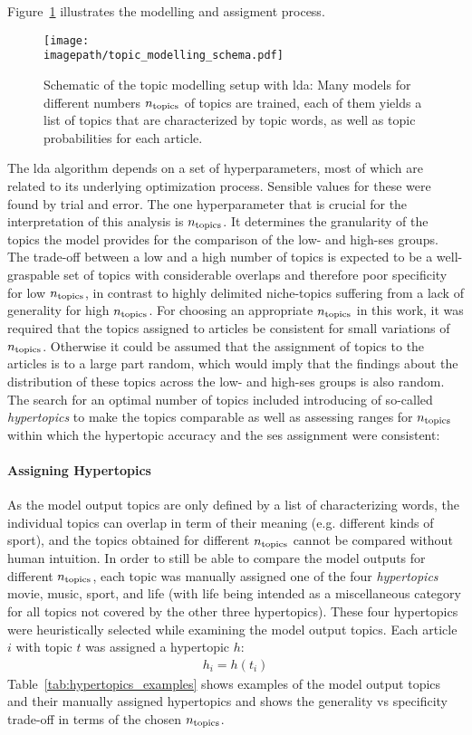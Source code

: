 Figure~\ref{fig:topic_modelling_schema} illustrates the modelling and assigment process.
\begin{figure}
    \centering
    \texttt{[image: \\imagepath/topic\_modelling\_schema.pdf]}
    \caption{Schematic of the topic modelling setup with \gls{lda}: Many models for different numbers $n_\text{topics}$ of topics are trained, each of them yields a list of topics that are characterized by topic words, as well as topic probabilities for each article.}\label{fig:topic_modelling_schema}
\end{figure}

The \gls{lda} algorithm depends on a set of hyperparameters, most of which are related to its underlying optimization process.  Sensible values for these were found by trial and error. The one hyperparameter that is crucial for the interpretation of this analysis is $n_\text{topics}$. It determines the granularity of the topics the model provides for the comparison of the low- and high-\gls{ses} groups. The trade-off between a low and a high number of topics is expected to be a well-graspable set of topics with considerable overlaps and therefore poor specificity for low $n_\text{topics}$, in contrast to highly delimited niche-topics suffering from a lack of generality for high $n_\text{topics}$. For choosing an appropriate $n_\text{topics}$ in this work, it was required that the topics assigned to articles be consistent for small variations of $n_\text{topics}$. Otherwise it could be assumed that the assignment of topics to the articles is to a large part random, which would imply that the findings about the distribution of these topics across the low- and high-\gls{ses} groups is also random. The search for an optimal number of topics included introducing of so-called \textit{hypertopics} to make the topics comparable as well as assessing ranges for $n_\text{topics}$ within which the hypertopic accuracy and the \gls{ses} assignment were consistent:

\paragraph{Assigning Hypertopics}
As the model output topics are only defined by a list of characterizing words, the individual topics can overlap in term of their meaning (e.g. different kinds of sport), and the topics obtained for different $n_\text{topics}$ cannot be compared without human intuition. In order to still be able to compare the model outputs for different $n_\text{topics}$, each topic was manually assigned one of the four \textit{hypertopics} movie, music, sport, and life (with life being intended as a miscellaneous category for all topics not covered by the other three hypertopics). These four hypertopics were heuristically selected while examining the model output topics. Each article $i$ with topic $t$ was assigned a hypertopic $h$:
\begin{align}
    h_i = h(t_i)
\end{align}
Table~\ref{tab:hypertopics_examples} shows examples of the model output topics and their manually assigned hypertopics and shows the generality vs specificity trade-off in terms of the chosen $n_\text{topics}$.

